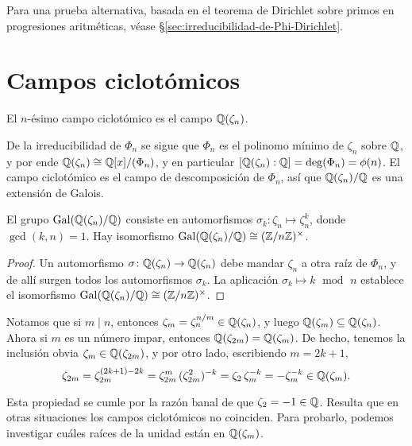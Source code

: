 Para una prueba alternativa, basada en el teorema de Dirichlet sobre primos
en progresiones aritméticas, véase \S\ref{sec:irreducibilidad-de-Phi-Dirichlet}.


\section{Campos ciclotómicos}
\label{sec:campos-ciclotomicos}

\begin{definicion}
  El $n$-ésimo campo ciclotómico es el campo $\mathbb{Q} (\zeta_n)$.
\end{definicion}

De la irreducibilidad de $\Phi_n$ se sigue que $\Phi_n$ es el polinomo mínimo de
$\zeta_n$ sobre $\mathbb{Q}$, y por ende $\mathbb{Q} (\zeta_n) \cong \mathbb{Q} [x] / (\Phi_n)$, y en
particular $[\mathbb{Q} (\zeta_n) : \mathbb{Q}] = \deg (\Phi_n) = \phi (n)$. El campo
ciclotómico es el campo de descomposición de $\Phi_n$, así que
$\mathbb{Q} (\zeta_n)/\mathbb{Q}$ es una extensión de Galois.

\begin{proposicion}
  El grupo $\operatorname{Gal} (\mathbb{Q}(\zeta_n)/\mathbb{Q})$ consiste en automorfismos
  $\sigma_k\colon \zeta_n \mapsto \zeta_n^k$, donde $\gcd (k,n) = 1$.
  Hay isomorfismo $\operatorname{Gal} (\mathbb{Q} (\zeta_n)/\mathbb{Q}) \cong (\mathbb{Z}/n\mathbb{Z})^\times$.

  \begin{proof}
    Un automorfismo $\sigma\colon \mathbb{Q}(\zeta_n) \to \mathbb{Q}(\zeta_n)$ debe mandar
    $\zeta_n$ a otra raíz de $\Phi_n$, y de allí surgen todos los automorfismos
    $\sigma_k$. La aplicación $\sigma_k \mapsto k\operatorname{~mod~}n$
    establece el isomorfismo $\operatorname{Gal} (\mathbb{Q} (\zeta_n)/\mathbb{Q}) \cong (\mathbb{Z}/n\mathbb{Z})^\times$.
  \end{proof}
\end{proposicion}

Notamos que si $m \mid n$, entonces $\zeta_m = \zeta_n^{n/m} \in \mathbb{Q} (\zeta_n)$,
y luego $\mathbb{Q} (\zeta_m) \subseteq \mathbb{Q} (\zeta_n)$. Ahora si $m$ es un número
impar, entonces $\mathbb{Q} (\zeta_{2m}) = \mathbb{Q} (\zeta_m)$. De hecho, tenemos la
inclusión obvia $\zeta_m \in \mathbb{Q} (\zeta_{2m})$, y por otro lado, escribiendo
$m = 2k + 1$,
\[ \zeta_{2m} = \zeta_{2m}^{(2k+1) - 2k}
             = \zeta_{2m}^{m}\,(\zeta_{2m}^2)^{-k}
             = \zeta_2\,\zeta_m^{-k}
             = -\zeta_m^{-k} \in \mathbb{Q} (\zeta_m). \]

Esta propiedad se cumle por la razón banal de que
$\zeta_2 = -1 \in \mathbb{Q}$. Resulta que en otras situaciones los campos ciclotómicos
no coinciden. Para probarlo, podemos investigar cuáles raíces de la unidad están
en $\mathbb{Q} (\zeta_m)$.


